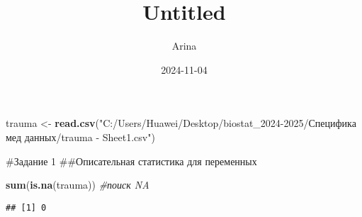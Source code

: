 \documentclass[
]{article}
\title{Untitled}
\author{Arina}
\date{2024-11-04}
\newenvironment{Shaded}{\begin{snugshade}}{\end{snugshade}}
\newcommand{\CommentTok}[1]{\textcolor[rgb]{0.56,0.35,0.01}{\textit{#1}}}
\newcommand{\FunctionTok}[1]{\textcolor[rgb]{0.13,0.29,0.53}{\textbf{#1}}}
\newcommand{\NormalTok}[1]{#1}
\newcommand{\OtherTok}[1]{\textcolor[rgb]{0.56,0.35,0.01}{#1}}
\newcommand{\SpecialCharTok}[1]{\textcolor[rgb]{0.81,0.36,0.00}{\textbf{#1}}}
\newcommand{\StringTok}[1]{\textcolor[rgb]{0.31,0.60,0.02}{#1}}
\begin{document}
\maketitle

\begin{Shaded}
\begin{Highlighting}[]
\NormalTok{trauma }\OtherTok{\textless{}{-}} \FunctionTok{read.csv}\NormalTok{(}\StringTok{"C:/Users/Huawei/Desktop/biostat\_2024{-}2025/Специфика мед данных/trauma {-} Sheet1.csv"}\NormalTok{)}
\end{Highlighting}
\end{Shaded}

\#Задание 1 \#\#Описательная статистика для переменных

\begin{Shaded}
\begin{Highlighting}[]
\FunctionTok{sum}\NormalTok{(}\FunctionTok{is.na}\NormalTok{(trauma)) }\CommentTok{\#поиск NA}
\end{Highlighting}
\end{Shaded}

\begin{verbatim}
## [1] 0
\end{verbatim}

\begin{Shaded}
\end{Shaded}
\end{document}
